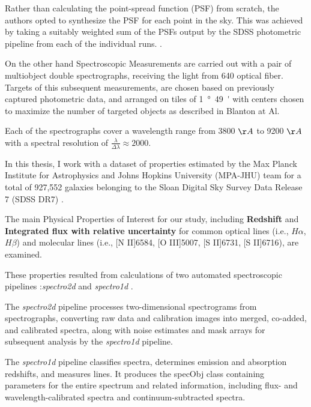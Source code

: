 Rather than calculating the point-spread function (PSF) from scratch, the authors opted to synthesize the PSF for each point in the sky. This was achieved by taking a suitably weighted sum of the PSFs output by the SDSS photometric pipeline from each of the individual runs. \cite{2009ApJS..182..543A}.

On the other hand Spectroscopic Measurements are carried out with a pair of multiobject double spectrographs, receiving the light from 640 optical fiber.
Targets of this subsequent measurements, are chosen based on previously captured photometric data, and arranged on tiles of \SI{1}{\degree49'} with centers chosen to maximize the number of targeted objects as described in Blanton at Al. \cite{2003AJ....125.2276B}

Each of the spectrographs cover a wavelength range from 3800 $\AA$ to 9200 $\AA$ with a spectral resolution of $\frac{\lambda}{\Delta \lambda} \approx 2000$. \cite{2009ApJS..182..543A}
\vspace{0.5cm}

In this thesis, I work with a dataset of properties estimated by the Max Planck Institute for Astrophysics and Johns Hopkins University (MPA-JHU) team for a total of 927,552 galaxies belonging to the Sloan Digital Sky Survey Data Release 7 (SDSS DR7) \cite{2009ApJS..182..543A, mpa-sdss-dr7}.

The main Physical Properties of Interest for our study, including \textbf{Redshift} and \textbf{Integrated flux with relative uncertainty} for common optical lines (i.e., $H\alpha$, $H\beta$) and molecular lines (i.e., [N II]6584, [O III]5007, [S II]6731, [S II]6716), are examined.

These properties resulted from calculations of two automated spectroscopic pipelines :\textit{spectro2d} and \textit{spectro1d} \cite{2002AJ....123..485S}.

The \textit{spectro2d} pipeline processes two-dimensional spectrograms from spectrographs, converting raw data and calibration images into merged, co-added, and calibrated spectra, along with noise estimates and mask arrays for subsequent analysis by the \textit{spectro1d} pipeline.

The \textit{spectro1d} pipeline classifies spectra, determines emission and absorption redshifts, and measures lines. It produces the specObj class containing parameters for the entire spectrum and related information, including flux- and wavelength-calibrated spectra and continuum-subtracted spectra.


